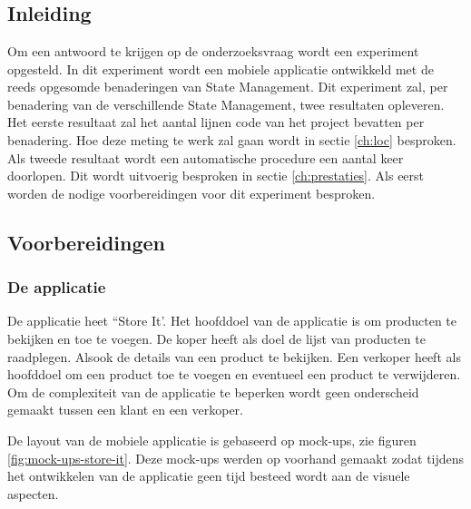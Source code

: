 
\chapter{}
\label{ch:methodologie}

\section{Inleiding}
Om een antwoord te krijgen op de onderzoeksvraag wordt een experiment opgesteld. In dit experiment wordt een mobiele applicatie ontwikkeld met de reeds opgesomde benaderingen van State Management. Dit experiment zal, per benadering van de verschillende State Management, twee resultaten opleveren. Het eerste resultaat zal het aantal lijnen code van het project bevatten per benadering. Hoe deze meting te werk zal gaan wordt in sectie \ref{ch:loc} besproken. Als tweede resultaat wordt een automatische procedure een aantal keer doorlopen. Dit wordt uitvoerig besproken in sectie \ref{ch:prestaties}. \newline
Als eerst worden de nodige voorbereidingen voor dit experiment besproken.

\section{Voorbereidingen}
\subsection{De applicatie}
De applicatie heet ``Store It'. Het hoofddoel van de applicatie is om producten te bekijken en toe te voegen. De koper heeft als doel de lijst van producten te raadplegen. Alsook de details van een product te bekijken. Een verkoper heeft als hoofddoel om een product toe te voegen en eventueel een product te verwijderen. Om de complexiteit van de applicatie te beperken wordt geen onderscheid gemaakt tussen een klant en een verkoper.\newline

De layout van de mobiele applicatie is gebaseerd op mock-ups, zie figuren \ref{fig:mock-ups-store-it}. Deze mock-ups werden op voorhand gemaakt zodat tijdens het ontwikkelen van de applicatie geen tijd besteed wordt aan de visuele aspecten.

